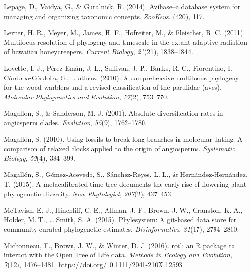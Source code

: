 \documentclass[
  english,
  man]{apa6}
\newlength{\cslhangindent}
\newlength{\cslentryspacingunit} %
\newenvironment{CSLReferences}[2] %
 {%
  \setlength{\parindent}{0pt}
  \ifodd #1
  \let\oldpar\par
  \def\par{\hangindent=\cslhangindent\oldpar}
  \fi
  \setlength{\parskip}{#2\cslentryspacingunit}
 }%
 {}
\begin{document}
\begin{CSLReferences}{1}{0}
\leavevmode{}%
Lepage, D., Vaidya, G., \& Guralnick, R. (2014). Avibase--a database system for managing and organizing taxonomic concepts. \emph{ZooKeys}, (420), 117.

\leavevmode{}%
Lerner, H. R., Meyer, M., James, H. F., Hofreiter, M., \& Fleischer, R. C. (2011). Multilocus resolution of phylogeny and timescale in the extant adaptive radiation of hawaiian honeycreepers. \emph{Current Biology}, \emph{21}(21), 1838--1844.

\leavevmode{}%
Lovette, I. J., Pérez-Emán, J. L., Sullivan, J. P., Banks, R. C., Fiorentino, I., Córdoba-Córdoba, S., \ldots{} others. (2010). A comprehensive multilocus phylogeny for the wood-warblers and a revised classification of the parulidae (aves). \emph{Molecular Phylogenetics and Evolution}, \emph{57}(2), 753--770.

\leavevmode{}%
Magallon, S., \& Sanderson, M. J. (2001). Absolute diversification rates in angiosperm clades. \emph{Evolution}, \emph{55}(9), 1762--1780.

\leavevmode{}%
Magallón, S. (2010). Using fossils to break long branches in molecular dating: A comparison of relaxed clocks applied to the origin of angiosperms. \emph{Systematic Biology}, \emph{59}(4), 384--399.

\leavevmode{}%
Magallón, S., Gómez-Acevedo, S., Sánchez-Reyes, L. L., \& Hernández-Hernández, T. (2015). A metacalibrated time-tree documents the early rise of flowering plant phylogenetic diversity. \emph{New Phytologist}, \emph{207}(2), 437--453.

\leavevmode{}%
McTavish, E. J., Hinchliff, C. E., Allman, J. F., Brown, J. W., Cranston, K. A., Holder, M. T., \ldots{} Smith, S. A. (2015). Phylesystem: A git-based data store for community-curated phylogenetic estimates. \emph{Bioinformatics}, \emph{31}(17), 2794--2800.

\leavevmode{}%
Michonneau, F., Brown, J. W., \& Winter, D. J. (2016). {rotl: an R package to interact with the Open Tree of Life data}. \emph{{Methods in Ecology and Evolution}}, \emph{7}(12), 1476--1481. \url{https://doi.org/10.1111/2041-210X.12593}


\end{CSLReferences}
\end{document}
